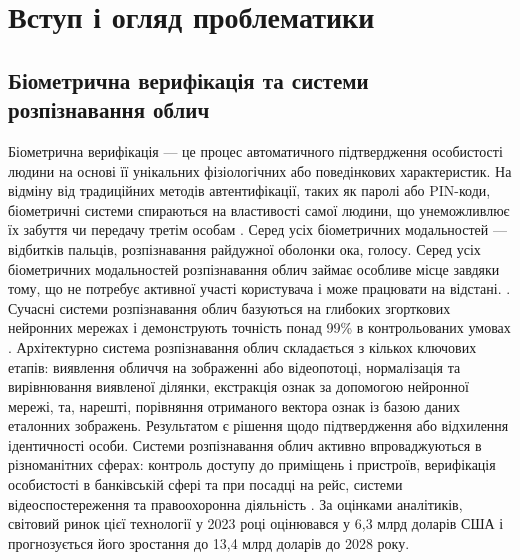 \documentclass[14pt,a4paper]{extarticle}
\begin{document}
\pagestyle{empty}
\tableofcontents
\newpage
\pagestyle{fancy}

\section{Вступ і огляд проблематики}
\subsection{Біометрична верифікація та системи розпізнавання облич}
Біометрична верифікація — це процес автоматичного підтвердження особистості людини на основі її унікальних фізіологічних або поведінкових характеристик.
На відміну від традиційних методів автентифікації, таких як паролі або PIN-коди, біометричні системи спираються на властивості самої людини, що унеможливлює
їх забуття чи передачу третім особам \cite{Tome2015}.
Серед усіх біометричних модальностей — відбитків пальців, розпізнавання райдужної оболонки ока, голосу. Серед усіх біометричних модальностей розпізнавання облич займає
особливе місце завдяки тому, що не потребує активної участі користувача і може працювати на відстані. \cite{Wang2021Survey}. Сучасні системи розпізнавання облич базуються на
глибоких згорткових нейронних мережах і демонструють точність понад 99\% в контрольованих умовах \cite{DHS2024}.
Архітектурно система розпізнавання облич складається з кількох ключових етапів: виявлення обличчя на зображенні або відеопотоці, нормалізація та вирівнювання
виявленої ділянки, екстракція ознак за допомогою нейронної мережі, та, нарешті, порівняння отриманого вектора ознак із базою даних еталонних зображень.
Результатом є рішення щодо підтвердження або відхилення ідентичності особи.
Системи розпізнавання облич активно впроваджуються в різноманітних сферах: контроль доступу до приміщень і пристроїв, верифікація особистості в банківській
сфері та при посадці на рейс, системи відеоспостереження та правоохоронна діяльність \cite{FacialRecognitionMarket2023}. За оцінками аналітиків, світовий ринок
цієї технології у 2023 році оцінювався у 6,3 млрд доларів США і прогнозується його зростання до 13,4 млрд доларів до 2028 року.
\end{document}
